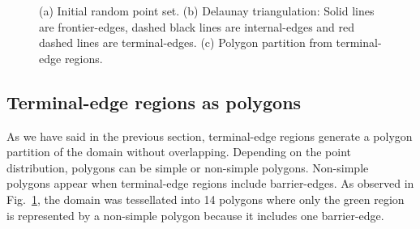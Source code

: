 \documentclass[lineno,pdflatex,sn-mathphys]{sn-jnl}%
\theoremstyle{thmstyleone}%
\theoremstyle{thmstyletwo}%
\theoremstyle{thmstylethree}%
\begin{document}
\begin{figure}[h]
\centering     %
{} 
\caption{(a) Initial random point set. (b) Delaunay triangulation: Solid lines are frontier-edges, dashed black lines are internal-edges and red dashed lines are terminal-edges. (c) Polygon partition from terminal-edge regions.}
\label{fig:general_example} 
\end{figure}

\subsection{Terminal-edge regions as  polygons}


As we have said in the previous section, terminal-edge regions generate a polygon partition of the domain without overlapping. Depending on the point distribution,  polygons can be simple or  non-simple polygons. Non-simple polygons appear when terminal-edge regions include barrier-edges.  As observed in Fig.~\ref{fig:general_example}, the domain was tessellated into 14 polygons where only the green region is represented by a  non-simple polygon because it includes one barrier-edge. 
\end{document}
